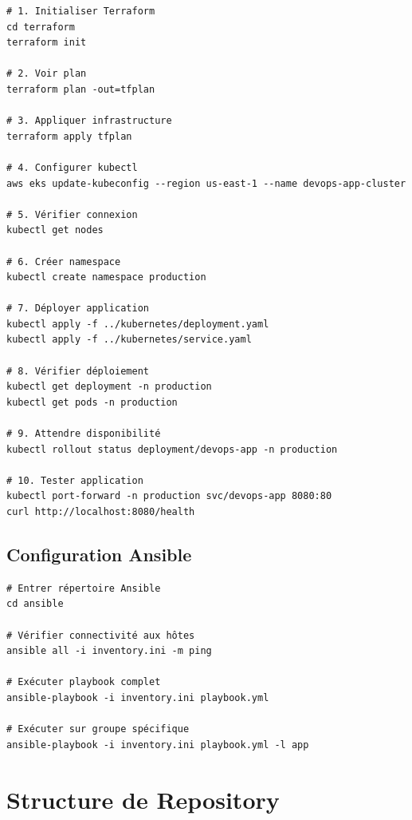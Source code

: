 \documentclass[12pt,a4paper]{report}
\begin{document}
\lstset{language=bash}
\begin{lstlisting}
# 1. Initialiser Terraform
cd terraform
terraform init

# 2. Voir plan
terraform plan -out=tfplan

# 3. Appliquer infrastructure
terraform apply tfplan

# 4. Configurer kubectl
aws eks update-kubeconfig --region us-east-1 --name devops-app-cluster

# 5. Vérifier connexion
kubectl get nodes

# 6. Créer namespace
kubectl create namespace production

# 7. Déployer application
kubectl apply -f ../kubernetes/deployment.yaml
kubectl apply -f ../kubernetes/service.yaml

# 8. Vérifier déploiement
kubectl get deployment -n production
kubectl get pods -n production

# 9. Attendre disponibilité
kubectl rollout status deployment/devops-app -n production

# 10. Tester application
kubectl port-forward -n production svc/devops-app 8080:80
curl http://localhost:8080/health
\end{lstlisting}

\subsection{Configuration Ansible}

\lstset{language=bash}
\begin{lstlisting}
# Entrer répertoire Ansible
cd ansible

# Vérifier connectivité aux hôtes
ansible all -i inventory.ini -m ping

# Exécuter playbook complet
ansible-playbook -i inventory.ini playbook.yml

# Exécuter sur groupe spécifique
ansible-playbook -i inventory.ini playbook.yml -l app
\end{lstlisting}

\section{Structure de Repository}
\end{document}
